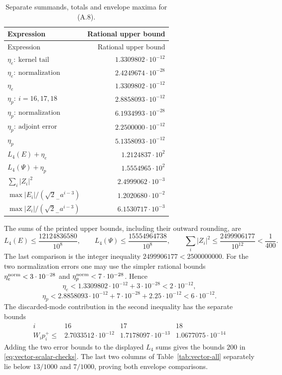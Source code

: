 {\small
\setlength{\tabcolsep}{3pt}
\begin{longtable}{lr}
\caption{Separate summands, totals and envelope maxima for (A.8).}\label{tab:vector-totals}\\
\toprule Expression & Rational upper bound\\ \midrule
\endfirsthead
\toprule Expression & Rational upper bound\\ \midrule
\endhead
\bottomrule\endfoot
$\eta_e:\ \text{kernel tail}$ & $1.3309802\cdot10^{-12}$\\
$\eta_e:\ \text{normalization}$ & $2.4249674\cdot10^{-28}$\\
$\eta_e$ & $1.3309802\cdot10^{-12}$\\
$\eta_p:\ i=16,17,18$ & $2.8858093\cdot10^{-12}$\\
$\eta_p:\ \text{normalization}$ & $6.1934993\cdot10^{-28}$\\
$\eta_p:\ \text{adjoint error}$ & $2.2500000\cdot10^{-12}$\\
$\eta_p$ & $5.1358093\cdot10^{-12}$\\
$L_4(E)+\eta_e$ & $1.2124837\cdot10^{2}$\\
$L_4(\Psi)+\eta_p$ & $1.5554965\cdot10^{2}$\\
$\sum_i|Z_i|^2$ & $2.4999062\cdot10^{-3}$\\
$\max |E_i|/(\sqrt2_-a^{i-3})$ & $1.2020680\cdot10^{-2}$\\
$\max |Z_i|/(\sqrt2_-a^{i-3})$ & $6.1530717\cdot10^{-3}$\\
\end{longtable}
}
The sums of the printed upper bounds, including their outward rounding, are
\[
L_4(E)\le\frac{12124836580}{10^8},\qquad L_4(\Psi)\le\frac{15554964738}{10^8},\qquad \sum_i|Z_i|^2\le\frac{2499906177}{10^{12}}<\frac1{400}.
\]
The last comparison is the integer inequality $2499906177<2500000000$. For the two normalization errors one may use the simpler rational bounds $\eta_e^{\rm norm}<3\cdot10^{-28}$ and $\eta_p^{\rm norm}<7\cdot10^{-28}$. Hence
\[
\eta_e<1.3309802\cdot10^{-12}+3\cdot10^{-28}<2\cdot10^{-12},
\]
\[
\eta_p<2.8858093\cdot10^{-12}+7\cdot10^{-28}+2.25\cdot10^{-12}<6\cdot10^{-12}.
\]
The discarded-mode contribution in the second inequality has the separate bounds
\[
\begin{array}{c|ccc}i&16&17&18\\\hline W_i p_i^+\le&2.7033512\cdot10^{-12}&1.7178097\cdot10^{-13}&1.0677075\cdot10^{-14}\end{array}
\]
Adding the two error bounds to the displayed $L_4$ sums gives the bounds $200$ in \eqref{eq:vector-scalar-checks}. The last two columns of Table~\ref{tab:vector-all} separately lie below $13/1000$ and $7/1000$, proving both envelope comparisons.

